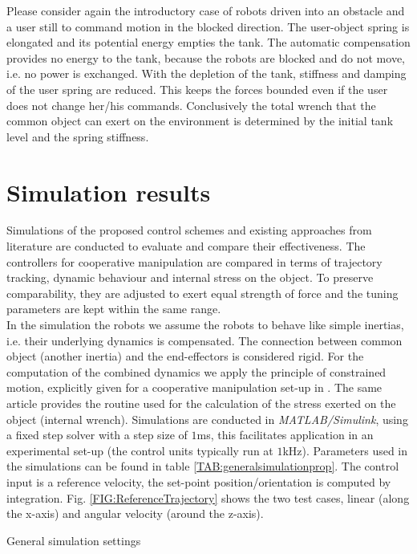 \documentclass[a4paper,twoside, openright,12pt]{report}
\begin{document}
{Please consider again the introductory case of robots driven into an obstacle and a user still to command motion in the blocked direction. The user-object spring is elongated and its potential energy empties the tank. The automatic compensation provides no energy to the tank, because the robots are blocked and do not move, i.e. no power is exchanged. With the depletion of the tank, stiffness and damping of the user spring are reduced. This keeps the forces bounded even if the user does not change her/his commands. Conclusively the total wrench that the common object can exert on the environment is determined by the initial tank level and the spring stiffness. 





\chapter{Simulation results}

Simulations of the proposed control schemes and existing approaches from literature are conducted to evaluate and compare their effectiveness. The controllers for cooperative manipulation are compared in terms of trajectory tracking, dynamic behaviour and internal stress on the object. To preserve comparability, they are adjusted to exert equal strength of force and the tuning parameters are kept within the same range.\\
In the simulation the robots we assume the robots to behave like simple inertias, i.e. their underlying dynamics is compensated. The connection between common object (another inertia) and the end-effectors is considered rigid. For the computation of the combined dynamics we apply the principle of constrained motion, explicitly given for a cooperative manipulation set-up in \cite{Erhart_16}. The same article provides the routine used for the calculation of the stress exerted on the object (internal wrench).
Simulations are conducted in \emph{MATLAB/Simulink}, using a fixed step solver with a step size of $1$ms, this facilitates application in an experimental set-up (the control units typically run at $1$kHz). Parameters used in the simulations can be found in table \ref{TAB:generalsimulationprop}. The control input is a  reference velocity, the set-point position/orientation is computed by integration. Fig. \ref{FIG:ReferenceTrajectory} shows the two test cases, linear (along the x-axis) and angular velocity (around the z-axis). 
\begin{table}[h]
	\centering
	\caption[General simulation settings]{General simulation settings}\vspace{10pt}
	\label{TAB:generalsimulationprop}
	

\end{table}}
\end{document}
